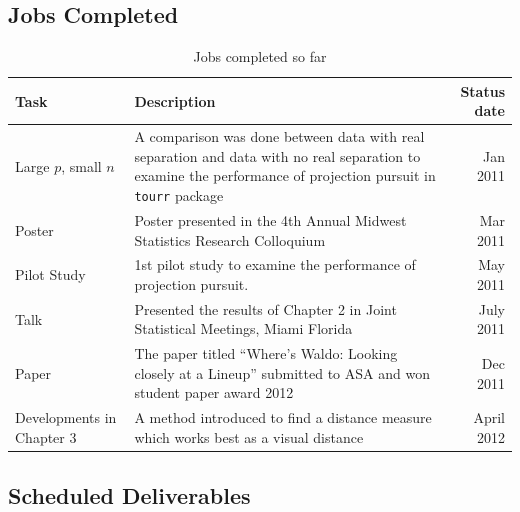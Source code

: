 \subsection{Jobs Completed}

\begin{table}[hbtp]
\caption{Jobs completed so far}
\centering 
\begin{tabular}{|l|p{10cm}|r|} 
\hline
Task &  Description & Status date\\ %
\hline
Large $p$, small $n$ & A comparison was done between data with real separation and data with no real separation to examine the performance of projection pursuit in \texttt{tourr} package \vspace{.1in} & Jan 2011 \\
Poster & Poster presented in the 4th Annual Midwest Statistics Research Colloquium\vspace{.1in} & Mar 2011 \\ 
Pilot Study & 1st pilot study to examine the performance of projection pursuit.  \vspace{.1in} & May 2011\\ 
Talk & Presented the results of Chapter 2 in Joint Statistical Meetings, Miami Florida \vspace{.1in} & July 2011 \\
Paper & The paper titled ``Where's Waldo: Looking closely at a Lineup'' submitted to ASA and won student paper award 2012 \vspace{.1in} & Dec 2011 \\

Developments in Chapter 3 & A method introduced to find a distance measure which works best as a visual distance \vspace{.1in} & April 2012\\
\hline
\end{tabular}
\label{tbl:cjob}
\end{table}	

\subsection{Scheduled Deliverables}

